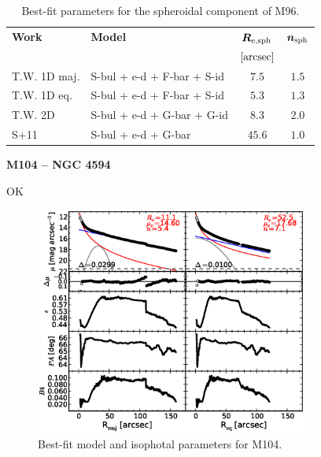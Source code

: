 \documentclass[preprint2]{emulateapj}
\newcommand{\fitfigurewidth}{0.8\textwidth}
\begin{document}
  \begin{table}[h]
  \small
  \caption{Best-fit parameters for the spheroidal component of M96.}
  \begin{center}
  \begin{tabular}{llcc}
  \hline
  {\bf Work} & {\bf Model}   & $\bm R_{\rm e,sph}$    & $\bm n_{\rm sph}$ \\
    &  &  $[\rm arcsec]$ & \\
  \hline
  T.W. 1D maj. & S-bul + e-d + F-bar + S-id  & $7.5$  &  $1.5$ \\
  T.W. 1D eq.  & S-bul + e-d + F-bar + S-id  & $5.3$  &  $1.3$ \\
  T.W. 2D      & S-bul + e-d + G-bar + G-id  & $8.3$  &  $2.0$ \\
  \hline
  S+11         & S-bul + e-d + G-bar  & $45.6$  &  $1.0$ \\
  \hline
  \end{tabular}
  \end{center}
  \label{tab:m96}
  \end{table}


  \clearpage\newpage\noindent

  {\bf M104 -- NGC 4594 \\} 

  OK

  \begin{figure}[h]
  \begin{center}
  \includegraphics[width=\fitfigurewidth]{images/m104_1Dfit.eps}
  \caption{Best-fit model and isophotal parameters for M104.}
  \end{center}
  \end{figure}
\end{document}
